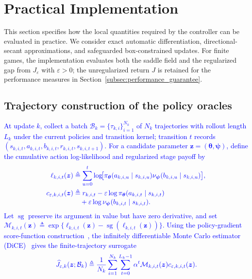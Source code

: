 \documentclass[journal]{IEEEtran}
\theoremstyle{remark}
\newcommand{\bz}{\boldsymbol{z}}
\newcommand{\btheta}{\boldsymbol{\theta}}
\newcommand{\bpsi}{\boldsymbol{\psi}}
\begin{document}
	\section{Practical Implementation}\label{sec:impl}
	This section specifies how the local quantities required by the controller can be evaluated in practice.
	We consider exact automatic differentiation, directional-secant approximations, and safeguarded box-constrained updates.
	For finite games, the implementation evaluates both the saddle field and the regularized gap from $J_\varepsilon$ with $\varepsilon>0$; the unregularized return $J$ is retained for the performance measures in Section~\ref{subsec:performance_guarantee}.
	
	\subsection{Trajectory construction of the policy oracles}\label{subsec:trajectory_oracles}
	\textcolor{blue}{At update $k$, collect a batch $\mathcal B_k=\{\tau_{k,i}\}_{i=1}^{N_k}$ of $N_k$ trajectories with rollout length $L_k$ under the current policies and transition kernel; transition $t$ records $(s_{k,i,t},a_{k,i,t},b_{k,i,t},r_{k,i,t},s_{k,i,t+1})$.}
	\textcolor{blue}{For a candidate parameter $\bz=(\btheta,\bpsi)$, define the cumulative action log-likelihood and regularized stage payoff by}
	\[
	\textcolor{blue}{
	\begin{aligned}
	\ell_{k,i,t}(\bz)
	&\triangleq\sum_{u=0}^{t}\log\!\bigl[
	\pi_{\btheta}(a_{k,i,u}\mid s_{k,i,u})
	\nu_{\bpsi}(b_{k,i,u}\mid s_{k,i,u})\bigr],\\
	c_{\varepsilon,k,i,t}(\bz)
	&\triangleq r_{k,i,t}
	-\varepsilon\log\pi_{\btheta}(a_{k,i,t}\mid s_{k,i,t})\\[-2pt]
	&\quad
	+\varepsilon\log\nu_{\bpsi}(b_{k,i,t}\mid s_{k,i,t}).
	\end{aligned}}
	\]
\textcolor{blue}{Let $\operatorname{sg}$ preserve its argument in value but have zero derivative, and set $\mathcal M_{k,i,t}(\bz)\triangleq\exp\{\ell_{k,i,t}(\bz)-\operatorname{sg}(\ell_{k,i,t}(\bz))\}$.}
\textcolor{blue}{Using the policy-gradient score-function construction~\cite{Sutton2000PolicyGradient}, the infinitely differentiable Monte Carlo estimator (DiCE)~\cite{Foerster2018DiCE} gives the finite-trajectory surrogate}
	\[
	\textcolor{blue}{
	\widehat J_{\varepsilon,k}(\bz;\mathcal B_k)
	\triangleq
	\frac{1}{N_k}\sum_{i=1}^{N_k}\sum_{t=0}^{L_k-1}
	\alpha^t\mathcal M_{k,i,t}(\bz)c_{\varepsilon,k,i,t}(\bz).}
	\]
\end{document}
